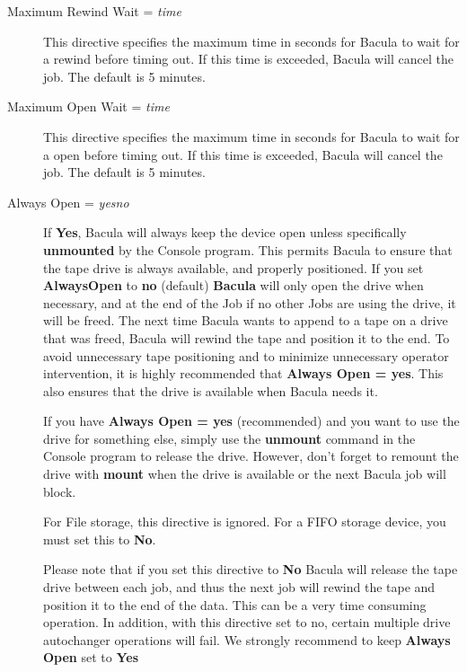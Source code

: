 \begin{description}
\item [Maximum Rewind Wait = {\it time}]
   This directive specifies the maximum time in seconds for Bacula to wait
   for a rewind before timing out.  If this time is exceeded,
   Bacula will cancel the job.  The default is 5 minutes.

\item [Maximum Open Wait = {\it time}]
   This directive specifies the maximum time in seconds for Bacula to wait
   for a open before timing out.  If this time is exceeded,
   Bacula will cancel the job.  The default is 5 minutes.

\item [Always Open = {\it yes\vb{}no}]
   If {\bf Yes}, Bacula will always keep the device open unless
   specifically {\bf unmounted} by the Console program.  This permits
   Bacula to ensure that the tape drive is always available, and properly
   positioned. If you set
   {\bf AlwaysOpen} to {\bf no} (default) {\bf Bacula} will only open the
   drive when necessary, and at the end of the Job if no other Jobs are
   using the drive, it will be freed.  The next time Bacula wants to append
   to a tape on a drive that was freed, Bacula will rewind the tape and
   position it to the end.  To avoid unnecessary tape positioning and to
   minimize unnecessary operator intervention, it is highly recommended
   that {\bf Always Open = yes}.  This also ensures that the drive is
   available when Bacula needs it.
   
   If you have {\bf Always Open = yes} (recommended) and you want to use the
   drive for something else, simply use the {\bf unmount} command in the
   Console program to release the drive. However, don't forget to remount the
   drive with {\bf mount} when the drive is available or the next Bacula job
   will block.
   
   For File storage, this directive is ignored. For a FIFO storage  device, you
   must set this to {\bf No}.  
   
   Please note that if you set this directive to {\bf No} Bacula  will release
   the tape drive between each job, and thus the next job  will rewind the tape
   and position it to the end of the data. This  can be a very time consuming
   operation. In addition, with this directive set to no, certain multiple
   drive autochanger operations will fail.  We strongly recommend to keep
   {\bf Always Open} set to {\bf Yes}


\end{description}

